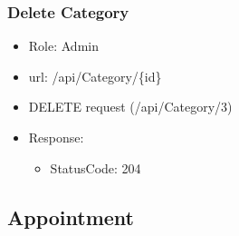 \documentclass[11pt]{article}
\begin{document}
\subsubsection{Delete Category}
\label{sec:orgb9f0278}
\begin{itemize}
\item Role: Admin
\item url: /api/Category/\{id\}
\item DELETE request (/api/Category/3)
\item Response:
\begin{itemize}
\item StatusCode: 204
\end{itemize}
\end{itemize}
\subsection{Appointment}
\label{sec:org228c473}
\end{document}

